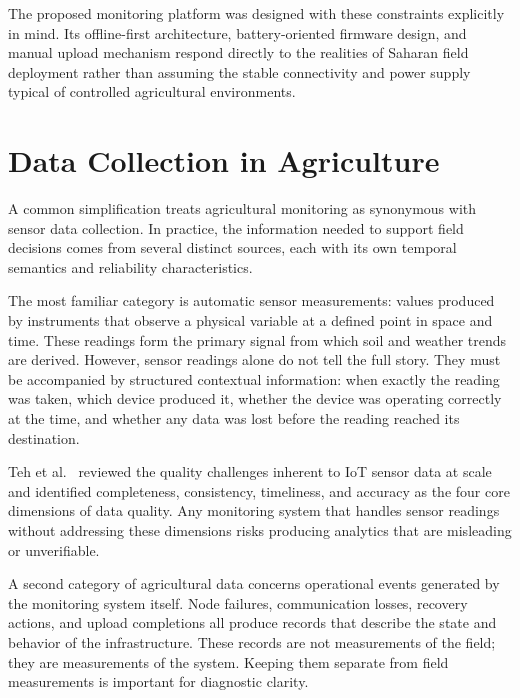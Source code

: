 The proposed monitoring platform was designed with these constraints explicitly in
mind. Its offline-first architecture, battery-oriented firmware design, and
manual upload mechanism respond directly to the realities of Saharan field
deployment rather than assuming the stable connectivity and power supply typical
of controlled agricultural environments.

\section{Data Collection in Agriculture}
\label{sec:data-collection}

A common simplification treats agricultural monitoring as synonymous with sensor
data collection. In practice, the information needed to support field decisions
comes from several distinct sources, each with its own temporal semantics and
reliability characteristics.

The most familiar category is automatic sensor measurements: values produced by
instruments that observe a physical variable at a defined point in space and time.
These readings form the primary signal from which soil and weather trends are
derived. However, sensor readings alone do not tell the full story. They must be
accompanied by structured contextual information: when exactly the reading was
taken, which device produced it, whether the device was operating correctly at
the time, and whether any data was lost before the reading reached its destination.

Teh et al.~\cite{teh2020sensor_data_quality} reviewed the quality challenges
inherent to IoT sensor data at scale and identified completeness, consistency,
timeliness, and accuracy as the four core dimensions of data quality. Any
monitoring system that handles sensor readings without addressing these dimensions
risks producing analytics that are misleading or unverifiable.

A second category of agricultural data concerns operational events generated by
the monitoring system itself. Node failures, communication losses, recovery
actions, and upload completions all produce records that describe the state and
behavior of the infrastructure. These records are not measurements of the field;
they are measurements of the system. Keeping them separate from field measurements
is important for diagnostic clarity.

